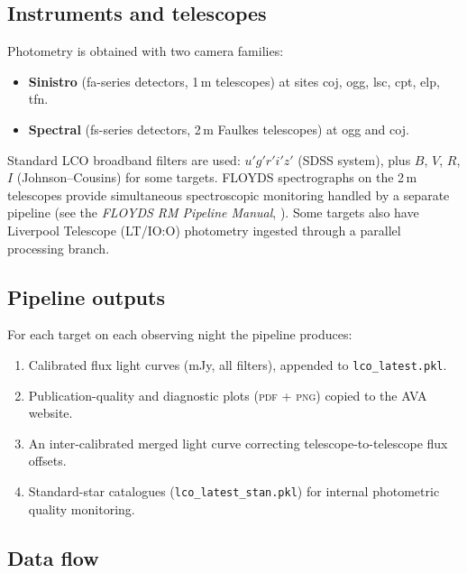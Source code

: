 \documentclass[12pt,a4paper]{article}
\begin{document}
\subsection{Instruments and telescopes}

Photometry is obtained with two camera families:
\begin{itemize}
  \item \textbf{Sinistro} (fa-series detectors, 1\,m telescopes) at sites coj, ogg, lsc,
        cpt, elp, tfn.
  \item \textbf{Spectral} (fs-series detectors, 2\,m Faulkes telescopes) at ogg and coj.
\end{itemize}
Standard LCO broadband filters are used: $u'g'r'i'z'$ (SDSS system), plus $B$, $V$, $R$,
$I$ (Johnson--Cousins) for some targets.  FLOYDS spectrographs on the 2\,m telescopes
provide simultaneous spectroscopic monitoring handled by a separate pipeline
(see the \emph{FLOYDS RM Pipeline Manual}, ).  Some targets also have Liverpool Telescope (LT/IO:O)
photometry ingested through a parallel processing branch.

\subsection{Pipeline outputs}

For each target on each observing night the pipeline produces:
\begin{enumerate}
  \item Calibrated flux light curves (mJy, all filters), appended to \texttt{lco\_latest.pkl}.
  \item Publication-quality and diagnostic plots (\textsc{pdf} + \textsc{png}) copied to the
        AVA website.
  \item An inter-calibrated merged light curve correcting telescope-to-telescope flux offsets.
  \item Standard-star catalogues (\texttt{lco\_latest\_stan.pkl}) for internal photometric
        quality monitoring.
\end{enumerate}

\subsection{Data flow}
\end{document}
